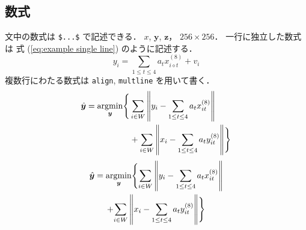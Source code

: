 \documentclass[a4paper,10pt]{ikelab-seminar}
\begin{document}
\subsection{数式}
文中の数式は \verb+$...$+ で記述できる．
$x$, $\bm{y}$, $\mathbf{z}$，
$256\times 256$．
一行に独立した数式は
式 (\ref{eq:example single line}) のように記述する．
   \begin{equation}
      \label{eq:example single line}
      y_i = \sum_{1 \leq t \leq 4} a_t x_{i \diamond t}^{(8)} + v_i
   \end{equation}
複数行にわたる数式は \texttt{align}, \texttt{multline} を用いて書く．
   \begin{align}
      \label{eq:example using align} 
      \hat{\bm y} = \argmin_{\bm y}
      \Biggl\{
         & \sum_{i \in W}
         \left\|
            y_i - \sum_{1 \leq t \leq 4}
            a_t x_{it}^{(8)}
         \right\|
      \Biggr. \nonumber \\ %
      & + 
      \Biggl.
         \sum_{i \in W}
         \left\|
            x_i - \sum_{1 \leq t \leq 4} 
            a_t y_{it}^{(8)}
         \right\|
      \Biggr\}
   \end{align}
   \begin{multline}
     \label{eq:example using multline} 
     \hat{\bm y} = \argmin_{\bm y}
        \Biggl\{
           \sum_{i \in W}
              \left\|
                 y_i - \sum_{1 \leq t \leq 4}
                    a_t x_{it}^{(8)}
              \right\|
        \Biggr. \\ %
     + \Biggl.
        \sum_{i \in W}
           \left\|
              x_i - \sum_{1 \leq t \leq 4}
                 a_t y_{it}^{(8)}
           \right\|
     \Biggr\}
   \end{multline}
\end{document}
